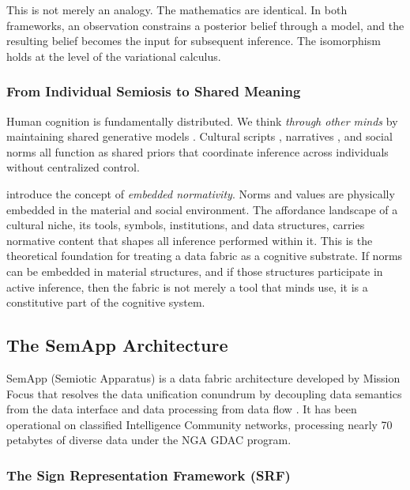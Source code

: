 \documentclass[11pt,a4paper]{article}
\theoremstyle{definition}
\begin{document}
\vspace{4pt}
\noindent This is not merely an analogy. The mathematics are identical. In both frameworks, an observation constrains a posterior belief through a model, and the resulting belief becomes the input for subsequent inference. The isomorphism holds at the level of the variational calculus.


\subsubsection{From Individual Semiosis to Shared Meaning}

Human cognition is fundamentally distributed. We think \emph{through other minds} by maintaining shared generative models \citep{veissiere2020thinking}. Cultural scripts \citep{albarracin2021variational}, narratives \citep{bouizegarene2023narrative}, and social norms \citep{constant2019regimes} all function as shared priors that coordinate inference across individuals without centralized control.

\citet{guenincarlut2023embedded} introduce the concept of \emph{embedded normativity}. Norms and values are physically embedded in the material and social environment. The affordance landscape of a cultural niche, its tools, symbols, institutions, and data structures, carries normative content that shapes all inference performed within it. This is the theoretical foundation for treating a data fabric as a cognitive substrate. If norms can be embedded in material structures, and if those structures participate in active inference, then the fabric is not merely a tool that minds use, it is a constitutive part of the cognitive system.

\subsection{The SemApp Architecture}
\label{sec:semapp}

SemApp (Semiotic Apparatus) is a data fabric architecture developed by Mission Focus that resolves the data unification conundrum by decoupling data semantics from the data interface and data processing from data flow \citep{yoakumstover2025semapp}. It has been operational on classified Intelligence Community networks, processing nearly 70 petabytes of diverse data under the NGA GDAC program.

\subsubsection{The Sign Representation Framework (SRF)}
\end{document}
